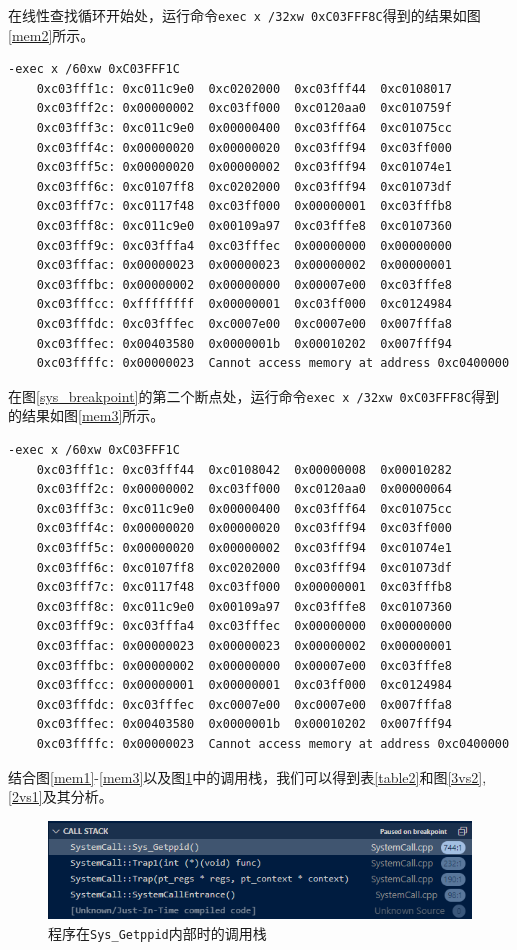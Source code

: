在线性查找循环开始处，运行命令\texttt{exec x /32xw 0xC03FFF8C}得到的结果如图\ref{mem2}所示。

\begin{Verbatim}[frame=single,fontsize=\small]
    -exec x /60xw 0xC03FFF1C
    0xc03fff1c:	0xc011c9e0	0xc0202000	0xc03fff44	0xc0108017
    0xc03fff2c:	0x00000002	0xc03ff000	0xc0120aa0	0xc010759f
    0xc03fff3c:	0xc011c9e0	0x00000400	0xc03fff64	0xc01075cc
    0xc03fff4c:	0x00000020	0x00000020	0xc03fff94	0xc03ff000
    0xc03fff5c:	0x00000020	0x00000002	0xc03fff94	0xc01074e1
    0xc03fff6c:	0xc0107ff8	0xc0202000	0xc03fff94	0xc01073df
    0xc03fff7c:	0xc0117f48	0xc03ff000	0x00000001	0xc03fffb8
    0xc03fff8c:	0xc011c9e0	0x00109a97	0xc03fffe8	0xc0107360
    0xc03fff9c:	0xc03fffa4	0xc03fffec	0x00000000	0x00000000
    0xc03fffac:	0x00000023	0x00000023	0x00000002	0x00000001
    0xc03fffbc:	0x00000002	0x00000000	0x00007e00	0xc03fffe8
    0xc03fffcc:	0xffffffff	0x00000001	0xc03ff000	0xc0124984
    0xc03fffdc:	0xc03fffec	0xc0007e00	0xc0007e00	0x007fffa8
    0xc03fffec:	0x00403580	0x0000001b	0x00010202	0x007fff94
    0xc03ffffc:	0x00000023	Cannot access memory at address 0xc0400000
\end{Verbatim}
\label{mem2}

在图\ref{sys_breakpoint}的第二个断点处，运行命令\texttt{exec x /32xw 0xC03FFF8C}得到的结果如图\ref{mem3}所示。

\begin{Verbatim}[frame=single,fontsize=\small]
    -exec x /60xw 0xC03FFF1C
    0xc03fff1c:	0xc03fff44	0xc0108042	0x00000008	0x00010282
    0xc03fff2c:	0x00000002	0xc03ff000	0xc0120aa0	0x00000064
    0xc03fff3c:	0xc011c9e0	0x00000400	0xc03fff64	0xc01075cc
    0xc03fff4c:	0x00000020	0x00000020	0xc03fff94	0xc03ff000
    0xc03fff5c:	0x00000020	0x00000002	0xc03fff94	0xc01074e1
    0xc03fff6c:	0xc0107ff8	0xc0202000	0xc03fff94	0xc01073df
    0xc03fff7c:	0xc0117f48	0xc03ff000	0x00000001	0xc03fffb8
    0xc03fff8c:	0xc011c9e0	0x00109a97	0xc03fffe8	0xc0107360
    0xc03fff9c:	0xc03fffa4	0xc03fffec	0x00000000	0x00000000
    0xc03fffac:	0x00000023	0x00000023	0x00000002	0x00000001
    0xc03fffbc:	0x00000002	0x00000000	0x00007e00	0xc03fffe8
    0xc03fffcc:	0x00000001	0x00000001	0xc03ff000	0xc0124984
    0xc03fffdc:	0xc03fffec	0xc0007e00	0xc0007e00	0x007fffa8
    0xc03fffec:	0x00403580	0x0000001b	0x00010202	0x007fff94
    0xc03ffffc:	0x00000023	Cannot access memory at address 0xc0400000
\end{Verbatim}
\label{mem3}

结合图\ref{mem1}-\ref{mem3}以及图\ref{stack}中的调用栈，我们可以得到表\ref{table2}和图\ref{3vs2},\ref{2vs1}及其分析。

\begin{figure}[!htbp]
    \centering
    \includegraphics[scale=1]{images/stack.png}
    \caption{程序在\texttt{Sys\_Getppid}内部时的调用栈}\label{stack}
\end{figure}

